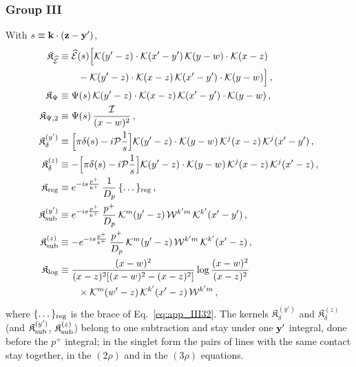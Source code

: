 \subsubsection*{Group III}
\noindent With $s\equiv\mathbf{k}\cdot(\mathbf{z}-\mathbf{y}')$,
\begin{align}\label{eq:sGIIIkernels}
\mathfrak K_{\widehat{\mathcal E}}&\equiv\widehat{\mathcal E}(s)\Big[\mathcal{K}(y'-z)\cdot\mathcal{K}(x'-y')\,\mathcal{K}(y-w)\cdot\mathcal{K}(x-z)\notag\\&\qquad-\mathcal{K}(y'-z)\cdot\mathcal{K}(x-z)\,\mathcal{K}(x'-y')\cdot\mathcal{K}(y-w)\Big]\,,\notag\\
\mathfrak K_\Psi&\equiv\Psi(s)\,\mathcal{K}(y'-z)\cdot\mathcal{K}(x-z)\,\mathcal{K}(x'-y')\cdot\mathcal{K}(y-w)\,,\notag\\
\mathfrak K_{\Psi,2}&\equiv\Psi(s)\,\frac{\mathcal I}{(x-w)^2}\,,\notag\\
\mathfrak K_\delta^{(y')}&\equiv\Big[\pi\delta(s)-i\mathcal P\frac1s\Big]\mathcal{K}(y'-z)\cdot\mathcal{K}(y-w)\,\mathcal{K}^j(x-z)\,\mathcal{K}^j(x'-y')\,,\notag\\
\mathfrak K_\delta^{(z)}&\equiv-\Big[\pi\delta(s)-i\mathcal P\frac1s\Big]\mathcal{K}(y'-z)\cdot\mathcal{K}(y-w)\,\mathcal{K}^j(x-z)\,\mathcal{K}^j(x'-z)\,,\notag\\
\mathfrak K_{\rm reg}&\equiv e^{-is\frac{p^+}{k^+}}\,\frac{1}{D_p}\,\{\dots\}_{\rm reg}\,,\notag\\
\mathfrak K_{\rm sub}^{(y')}&\equiv e^{-is\frac{p^+}{k^+}}\,\frac{p^+}{D_p}\,\mathcal{K}^m(y'-z)\,\mathcal W^{k'm}\,\mathcal{K}^{k'}(x'-y')\,,\notag\\
\mathfrak K_{\rm sub}^{(z)}&\equiv-e^{-is\frac{p^+}{k^+}}\,\frac{p^+}{D_p}\,\mathcal{K}^m(y'-z)\,\mathcal W^{k'm}\,\mathcal{K}^{k'}(x'-z)\,,\notag\\
\mathfrak K_{\log}&\equiv\frac{(x-w)^2}{(x-z)^2[(x-w)^2-(x-z)^2]}\log\frac{(x-w)^2}{(x-z)^2}\notag\\&\qquad\times\mathcal{K}^m(w'-z)\,\mathcal{K}^{k'}(x'-z)\,\mathcal W^{k'm}\,,
\end{align}
where $\{\dots\}_{\rm reg}$ is the brace of Eq.~\eqref{eq:app_III32}. The kernels $\mathfrak K_\delta^{(y')}$ and $\mathfrak K_\delta^{(z)}$ (and $\mathfrak K^{(y')}_{\rm sub}$, $\mathfrak K^{(z)}_{\rm sub}$) belong to one subtraction and stay under one $\mathbf{y}'$ integral, done before the $p^+$ integral; in the singlet form the pairs of lines with the same contact stay together, in the $(2\rho)$ and in the $(3\rho)$ equations.

